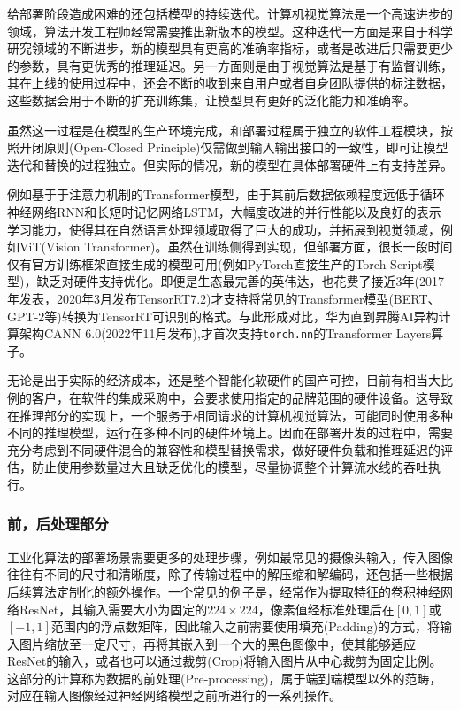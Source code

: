 \documentclass[master,anonymous]{shtthesis}
\begin{document}
给部署阶段造成困难的还包括模型的持续迭代。计算机视觉算法是一个高速进步的领域，算法开发工程师经常需要推出新版本的模型。这种迭代一方面是来自于科学研究领域的不断进步，新的模型具有更高的准确率指标，或者是改进后只需要更少的参数，具有更优秀的推理延迟。另一方面则是由于视觉算法是基于有监督训练，其在上线的使用过程中，还会不断的收到来自用户或者自身团队提供的标注数据，这些数据会用于不断的扩充训练集，让模型具有更好的泛化能力和准确率。

虽然这一过程是在模型的生产环境完成，和部署过程属于独立的软件工程模块，按照开闭原则(Open-Closed Principle)仅需做到输入输出接口的一致性，即可让模型迭代和替换的过程独立。但实际的情况，新的模型在具体部署硬件上有支持差异。

例如基于于注意力机制的Transformer\cite{vaswani2017attention}模型，由于其前后数据依赖程度远低于循环神经网络RNN和长短时记忆网络LSTM，大幅度改进的并行性能以及良好的表示学习能力，使得其在自然语言处理领域取得了巨大的成功，并拓展到视觉领域，例如ViT(Vision Transformer)\cite{khan2022transformers}。虽然在训练侧得到实现，但部署方面，很长一段时间仅有官方训练框架直接生成的模型可用(例如PyTorch直接生产的Torch Script模型)，缺乏对硬件支持优化。即便是生态最完善的英伟达，也花费了接近3年(2017年发表，2020年3月发布TensorRT7.2)才支持将常见的Transformer模型(BERT、GPT-2等)转换为TensorRT\cite{tensorrt7}可识别的格式。与此形成对比，华为直到昇腾AI异构计算架构CANN 6.0(2022年11月发布)\cite{HuaweiCANN},才首次支持\verb|torch.nn|的Transformer Layers算子。

无论是出于实际的经济成本，还是整个智能化软硬件的国产可控，目前有相当大比例的客户，在软件的集成采购中，会要求使用指定的品牌范围的硬件设备。这导致在推理部分的实现上，一个服务于相同请求的计算机视觉算法，可能同时使用多种不同的推理模型，运行在多种不同的硬件环境上。因而在部署开发的过程中，需要充分考虑到不同硬件混合的兼容性和模型替换需求，做好硬件负载和推理延迟的评估，防止使用参数量过大且缺乏优化的模型，尽量协调整个计算流水线的吞吐执行。

\subsubsection{前，后处理部分}\label{前，后处理部分}
工业化算法的部署场景需要更多的处理步骤，例如最常见的摄像头输入，传入图像往往有不同的尺寸和清晰度，除了传输过程中的解压缩和解编码，还包括一些根据后续算法定制化的额外操作。一个常见的例子是，经常作为提取特征的卷积神经网络ResNet，其输入需要大小为固定的$224\times224$，像素值经标准处理后在$[0, 1]$或$[-1, 1]$范围内的浮点数矩阵，因此输入之前需要使用填充(Padding)的方式，将输入图片缩放至一定尺寸，再将其嵌入到一个大的黑色图像中，使其能够适应ResNet的输入，或者也可以通过裁剪(Crop)将输入图片从中心裁剪为固定比例。这部分的计算称为数据的前处理(Pre-processing)，属于端到端模型以外的范畴，对应在输入图像经过神经网络模型之前所进行的一系列操作。
\end{document}
